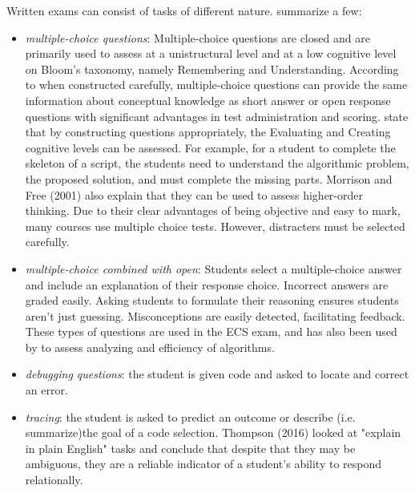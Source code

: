 Written exams can consist of tasks of different nature.  summarize a few:
\begin{itemize}
\item \emph{multiple-choice questions}: Multiple-choice questions are closed and are primarily used to assess at a unistructural level \cite{Zhong2016} and at a low cognitive level on Bloom's taxonomy, namely Remembering and Understanding\cite{zur-burgury2013israelExam}. According to  when constructed carefully, multiple-choice questions can provide the same information about conceptual knowledge as short answer or open response questions with significant advantages in test administration and scoring. \cite{zur-burgury2013israelExam} state that by constructing questions appropriately, the Evaluating and Creating cognitive levels can be assessed. For example, for a student to complete the skeleton of a script, the students need to understand the algorithmic problem, the proposed solution, and must complete the missing parts. Morrison and Free (2001) also explain that they can be used to assess higher-order thinking. Due to their clear advantages of being objective and easy to mark, many courses use multiple choice tests. However, distracters must be selected carefully.
\item \emph{multiple-choice combined with open}: Students select a multiple-choice answer and include an explanation of their response choice. Incorrect answers are graded easily. Asking students to formulate their reasoning ensures students aren't just guessing. Misconceptions are easily detected, facilitating feedback. These types of questions are used in the ECS exam, and has also been used by \cite{gal2002efficiency} to assess analyzing and efficiency of algorithms.
\item \emph{debugging questions}: the student is given code and asked to locate and correct an error.
\item \emph{tracing}: the student is asked to predict an outcome or describe (i.e. summarize)the goal of a code selection. Thompson (2016) looked at "explain in plain English" tasks and conclude that despite that they may be ambiguous, they are a reliable indicator of a student’s ability to respond relationally.


\end{itemize}
